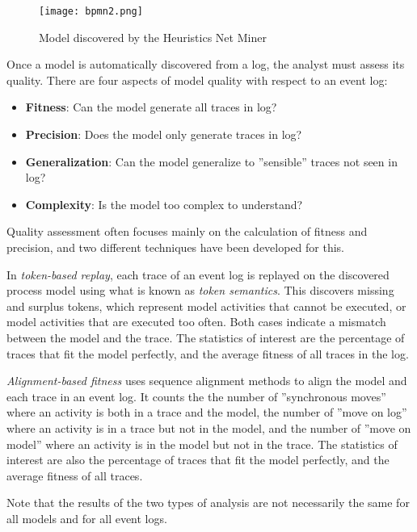\begin{figure}
\centering
\texttt{[image: bpmn2.png]}
\caption{Model discovered by the Heuristics Net Miner}
\label{fig:heuristics_example}
\end{figure}

Once a model is automatically discovered from a log, the analyst must assess its quality. There are four aspects of model quality with respect to an event log:

\begin{itemize}
   \item \textbf{Fitness}: Can the model generate all traces in log?
   \item \textbf{Precision}: Does the model only generate traces in log?
   \item \textbf{Generalization}: Can the model generalize to ''sensible'' traces not seen in log?
   \item \textbf{Complexity}: Is the model too complex to understand?
\end{itemize}

Quality assessment often focuses mainly on the calculation of fitness and precision, and two different techniques have been developed for this.

In \emph{token-based replay}, each trace of an event log is replayed on the discovered process model using what is known as \emph{token semantics}. This discovers missing and surplus tokens, which represent model activities that cannot be executed, or model activities that are executed too often. Both cases indicate a mismatch between the model and the trace. The statistics of interest are the percentage of traces that fit the model perfectly, and the average fitness of all traces in the log.

\emph{Alignment-based fitness} uses sequence alignment methods to align the model and each trace in an event log. It counts the the number of ''synchronous moves'' where an activity is both in a trace and the model, the number of ''move on log'' where an activity is in a trace but not in the model, and the number of ''move on model'' where an activity is in the model but not in the trace. The statistics of interest are also the percentage of traces that fit the model perfectly, and the average fitness of all traces.

Note that the results of the two types of analysis are not necessarily the same for all models and for all event logs.

